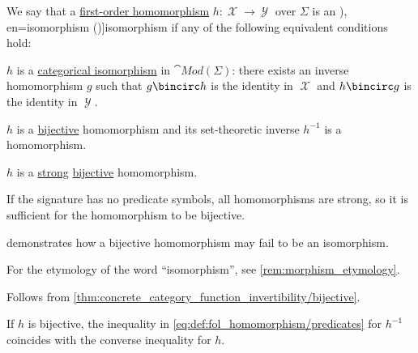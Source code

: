 \begin{definition}\label{def:fol_isomorphism}
  We say that a \hyperref[def:fol_homomorphism]{first-order homomorphism} \( h: \mscrX \to \mscrY \) over \( \Sigma \) is an \term[ru=изоморфизм (\cite[170]{Герасимов2014Вычислимость}), en=isomorphism (\cite[def. 2.3.1]{Hinman2005Logic})]{isomorphism} if any of the following equivalent conditions hold:
  \begin{thmenum}
    \mimprovised \( h \) is a \hyperref[def:morphism_invertibility/isomorphism]{categorical isomorphism} in \( \cat{Mod}(\Sigma) \): there exists an inverse homomorphism \( g \) such that \( g \bincirc h \) is the identity in \( \mscrX \) and \( h \bincirc g \) is the identity in \( \mscrY \).

    \mimprovised \( h \) is a \hyperref[def:function_invertibility/bijective]{bijective} homomorphism and its set-theoretic inverse \( h^{-1} \) is a homomorphism.

     \( h \) is a \hyperref[def:fol_homomorphism/predicates]{strong} \hyperref[def:function_invertibility/bijective]{bijective} homomorphism.

    If the signature has no predicate symbols, all homomorphisms are strong, so it is sufficient for the homomorphism to be bijective.
  \end{thmenum}
\end{definition}
\begin{comments}
  \item {} demonstrates how a bijective homomorphism may fail to be an isomorphism.
  \item For the etymology of the word \enquote{isomorphism}, see \cref{rem:morphism_etymology}.
\end{comments}
\begin{defproof}
   Follows from \cref{thm:concrete_category_function_invertibility/bijective}.

   If \( h \) is bijective, the inequality in \eqref{eq:def:fol_homomorphism/predicates} for \( h^{-1} \) coincides with the converse inequality for \( h \).
\end{defproof}

